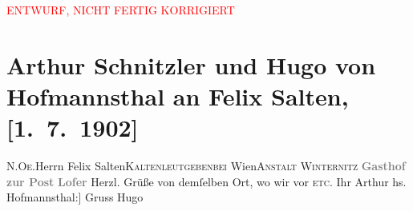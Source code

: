
\begin{center}
            \textcolor{red}{ENTWURF, NICHT FERTIG KORRIGIERT}
                      \end{center}
            
         
         \renewcommand{\erwaehntePersonen}{Personen: Felix Salten}
         \renewcommand{\erwaehnteOrte}{Orte: Gasthof zur Post, Kaltenleutgeben, Kaltwasserheilanstalt Winternitz, Lofer, Niederösterreich, Wien}
         \renewcommand{\erwaehnteWerke}{}
               \section[Arthur Schnitzler und Hugo von Hofmannsthal an Felix Salten, {[}1. 7. 1902{]}]{ Arthur Schnitzler und Hugo von Hofmannsthal an Felix Salten,
               {[}1. 7. 1902{]}}\nopagebreak{}\rehead{ }\begin{ledgroupsized}[t]{13cm}\normalsize\beginnumbering \toendnotes[C]{\smallbreak\pagebreak[2]} 
\toendnotes[C]{\smallbreak}\pstart{}{\pb}\textsc{N.Oe.}\pend{}\pstart{}Herrn Felix Salten\pend{}\pstart{}\textsc{Kaltenleutgeben}\pend{}\pstart{}\textsc{bei}{ }Wien\pend{}\pstart{}\textsc{Anstalt Winternitz}\pend{}{\bigskip}\pstart
           \noindent{}\centering{}{\pb}\textcolor{gray}{\textbf{Gasthof zur Post}}\pend
           \pstart
           \noindent{}\centering{}\textcolor{gray}{\textbf{Lofer}}\pend
           \pstart
           Herzl. Grüße von demſelben Ort, wo wir vor \label{K_L02977-1v}\label{K_L02977-1h}{ }\textsc{etc.}\pend
           \pstart Ihr \spacefill\mbox{Arthur}\pend{}\pstart
           \noindent{}{[}hs. Hofmannsthal:{]} Gruss \spacefill\mbox{Hugo}\pend
           
         
         \endnumbering{}\end{ledgroupsized}\begin{anhang}\end{anhang}\newcommand{\dateiname}{L02977}\newcommand{\titel}{Arthur Schnitzler und Hugo von Hofmannsthal an Felix Salten, [1. 7. 1902]}\newcommand{\editorInnen}{Martin Anton Müller und Laura Untner}
      